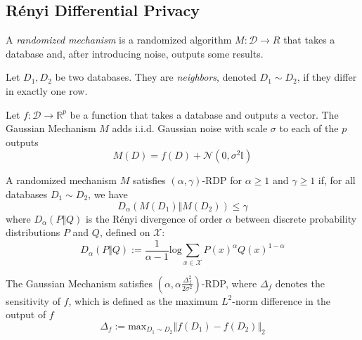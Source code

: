 \documentclass[manuscript,screen,review,anonymous]{acmart}
\renewcommand{\implies}{\rightarrow}
\newcommand{\db}{D}
\newcommand{\dbs}{\mathcal{D}}
\newcommand{\prob}[1]{\text{Pr}[#1]}
\begin{document}
\subsection{R\'enyi Differential Privacy}


A \emph{randomized mechanism} is a randomized algorithm $M : \dbs \implies R$ that takes a database and, after introducing noise, outputs some results.

Let $\db_1,\db_2$ be two databases. They are \emph{neighbors}, denoted $\db_1 \sim \db_2$, if they differ in exactly one row.

\begin{definition}\label{def:gm}
Let $f : \dbs \implies \mathbb{R}^p$ be a function that takes a database and outputs a vector. The Gaussian Mechanism $M$ adds i.i.d. Gaussian noise with scale $\sigma$ to each of the $p$ outputs
\[
M(\db) = f(\db) + \mathcal{N}(0, \sigma^2 \mathbb{I})
\]
\end{definition}

\begin{definition}\label{def:rdp}
A randomized mechanism $M$ satisfies $(\alpha,\gamma)$-RDP for $\alpha \geq 1$ and $\gamma \geq 1$ if, for all databases $\db_1 \sim \db_2$, we have
\[
D_\alpha(M(\db_1) \Vert M(\db_2)) \leq \gamma
\]
where $D_\alpha(P \Vert Q)$ is the R\'enyi divergence\cite{van2014renyi,van2010renyi,li2016renyi} of order $\alpha$ between discrete probability distributions $P$ and $Q$, defined on $\mathcal{X}$:
\[
D_\alpha(P \Vert Q) := \frac{1}{\alpha - 1} \text{log} \sum_{x \in \mathcal{X}} {P(x)}^\alpha {Q(x)}^{1-\alpha}
\]
\end{definition}

\begin{theorem}
The Gaussian Mechanism satisfies $(\alpha, \alpha \frac{\Delta^2_f}{2 \sigma^2})$-RDP, where $\Delta_f$ denotes the sensitivity\cite{dwork2014algorithmic} of $f$, which is defined as the maximum $L^2$-norm difference in the output of $f$
\[
\Delta_f := \text{max}_{\db_1 \sim \db_2} \Vert f(\db_1) - f(\db_2) \Vert_2
\]
\end{theorem}
\end{document}
